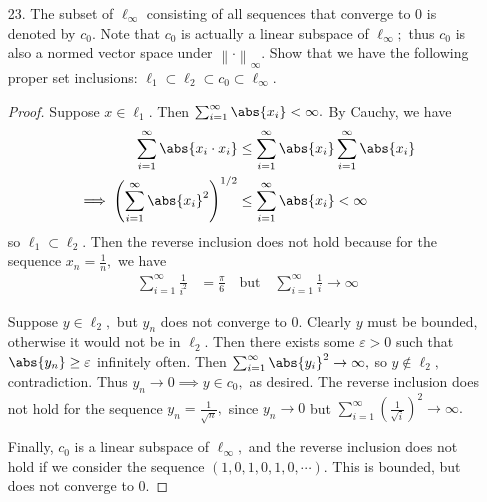 \documentclass{article}
\begin{document}
\begin{itemize}
\begin{proof}
			By Cauchy, we have
			\begin{align*}
				\sum_{i=1}^{\infty} \abs{x_i\cdot x_i} &\le \sum_{i=1}^{\infty} \abs{x_i}\sum_{i=1}^{\infty} \abs{x_i} \\
				\implies \left\lVert x \right\rVert_2 = \left( \sum_{i=1}^{\infty}\abs{x_i}^2 \right)^{1/2} &\le \sum_{i=1}^{\infty} \abs{x_i} = \left\lVert x \right\rVert_1
			\end{align*}
		\end{proof}

	\item[23.] The subset of $\ell_\infty$ consisting of all sequences that converge to 0 is denoted by $c_0.$ Note that $c_0$ is actually a linear subspace of $\ell_\infty;$ thus $c_0$ is also a normed vector space under $\left\lVert \cdot \right\rVert_\infty.$ Show that we have the following proper set inclusions: $\ell_1\subset\ell_2\subset c_0\subset\ell_\infty.$
		\begin{proof}
			Suppose $x\in \ell_1.$ Then $\sum_{i=1}^{\infty} \abs{x_i}<\infty.$ By Cauchy, we have
			\begin{align*}
				\sum_{i=1}^{\infty}\abs{x_i\cdot x_i} &\le \sum_{i=1}^{\infty}\abs{x_i}\sum_{i=1}^{\infty}\abs{x_i} \\
				\implies \left( \sum_{i=1}^{\infty} \abs{x_i}^2 \right)^{1/2} &\le \sum_{i=1}^{\infty}\abs{x_i}<\infty
			\end{align*}
			so $\ell_1\subset\ell_2.$ Then the reverse inclusion does not hold because for the sequence $x_n=\frac{1}{n},$ we have
			\begin{align*}
				\sum_{i=1}^{\infty} \frac{1}{i^2} &= \frac{\pi}{6} \quad\text{but}\quad \sum_{i=1}^{\infty} \frac{1}{i} \to \infty
			\end{align*}

			Suppose $y\in \ell_2,$ but $y_n$ does not converge to 0. Clearly $y$ must be bounded, otherwise it would not be in $\ell_2.$ Then there exists some $\varepsilon>0$ such that $\abs{y_n}\ge\varepsilon$ infinitely often. Then $\sum_{i=1}^{\infty}\abs{y_i}^2\to\infty,$ so $y\notin\ell_2,$ contradiction. Thus $y_n\to0\implies y\in c_0,$ as desired. The reverse inclusion does not hold for the sequence $y_n=\frac{1}{\sqrt{n}},$ since $y_n\to 0$ but $\sum_{i=1}^{\infty} \left( \frac{1}{\sqrt{i}} \right)^2 \to\infty.$

			Finally, $c_0$ is a linear subspace of $\ell_\infty,$ and the reverse inclusion does not hold if we consider the sequence $(1, 0, 1, 0, 1, 0, \cdots).$ This is bounded, but does not converge to 0.
		\end{proof}


\end{itemize}
\end{document}
